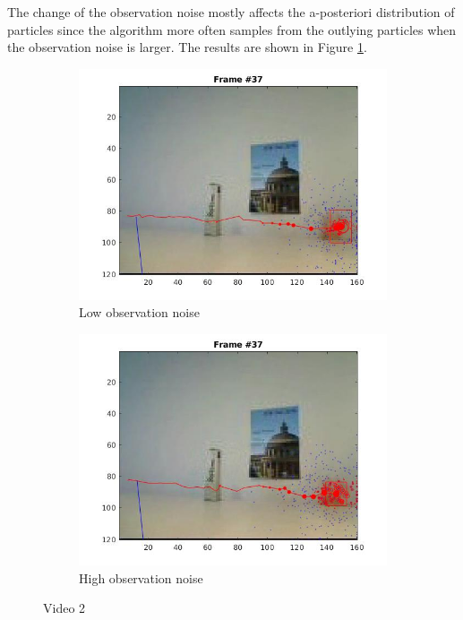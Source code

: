 \documentclass[paper=a4, fontsize=11pt]{scrartcl} %
\numberwithin{equation}{section} %
\numberwithin{figure}{section} %
\numberwithin{table}{section} %
\begin{document}
The change of the observation noise mostly affects the a-posteriori distribution of particles since the algorithm more often samples from the outlying particles when the observation noise is larger. The results are shown in Figure \ref{fig:v2_obs_noise}.

\begin{figure}
\centering
\begin{subfigure}{.5\textwidth}
  \centering
  \includegraphics[width=.9\linewidth]{video21_l_obs_sigma.jpg}
  \caption{Low observation noise}
\end{subfigure}%
\begin{subfigure}{.5\textwidth}
  \centering
  \includegraphics[width=.9\linewidth]{video21_h_obs_sigma.jpg}
  \caption{High observation noise}
\end{subfigure}
\caption{Video 2}
\label{fig:v2_obs_noise}
\end{figure}
\end{document}
